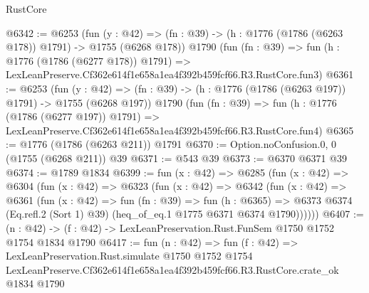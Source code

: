 \begin{lexlean}{RustCore}
\begin{coremodule}
@6342 := @6253
    (fun (y : @42) => (fn : @39) -> (h : @1776 (@1786 (@6263 @178)) @1791) -> @1755 (@6268 @178))
    @1790
    (fun (fn : @39) =>
    fun (h : @1776 (@1786 (@6277 @178)) @1791) =>
    LexLeanPreserve.Cf362e614f1e658a1ea4f392b459fcf66.R3.RustCore.fun3)
@6361 := @6253
    (fun (y : @42) => (fn : @39) -> (h : @1776 (@1786 (@6263 @197)) @1791) -> @1755 (@6268 @197))
    @1790
    (fun (fn : @39) =>
    fun (h : @1776 (@1786 (@6277 @197)) @1791) =>
    LexLeanPreserve.Cf362e614f1e658a1ea4f392b459fcf66.R3.RustCore.fun4)
@6365 := @1776 (@1786 (@6263 @211)) @1791
@6370 := Option.noConfusion.{0, 0} (@1755 (@6268 @211)) @39
@6371 := @543 @39
@6373 := @6370 @6371 @39
@6374 := @1789 @1834
@6399 := fun (x : @42) =>
  @6285
    (fun (x : @42) =>
    @6304
      (fun (x : @42) =>
      @6323
        (fun (x : @42) =>
        @6342
          (fun (x : @42) =>
          @6361
            (fun (x : @42) =>
            fun (fn : @39) =>
            fun (h : @6365) =>
            @6373 @6374 (Eq.refl.{2} (Sort 1) @39) (heq_of_eq.{1} @1775 @6371 @6374 @1790))))))
@6407 := (n : @42) -> (f : @42) -> LexLeanPreservation.Rust.FunSem @1750 @1752 @1754 @1834 @1790
@6417 := fun (n : @42) =>
  fun (f : @42) =>
  LexLeanPreservation.Rust.simulate
    @1750
    @1752
    @1754
    LexLeanPreserve.Cf362e614f1e658a1ea4f392b459fcf66.R3.RustCore.crate_ok
    @1834
    @1790
\end{coremodule}
\end{lexlean}
